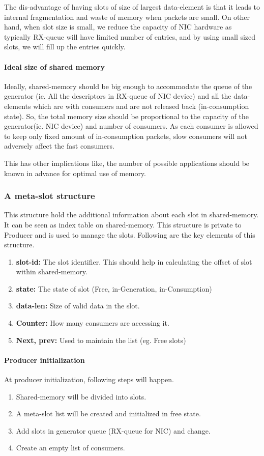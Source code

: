 \documentclass[a4paper,twoside]{report} %
\begin{document}
The dis-advantage of having slots of size of largest data-element
is that it leads to internal fragmentation and waste of memory 
when packets are small.  On other hand, when slot size is small,
we reduce the capacity of NIC hardware as typically RX-queue
will have limited number of entries, and by using small sized
slots, we will fill up the entries quickly.


\paragraph{Ideal size of shared memory}
Ideally, shared-memory should be big enough to accommodate the queue
of the generator (ie. All the descriptors in RX-queue of NIC device)
and all the data-elements which are with consumers and are not released 
back (in-consumption state).  So, the total memory size should be
proportional to the capacity of the generator(ie. NIC device) and 
number of consumers.  As each consumer is allowed to keep only fixed 
amount of in-consumption packets, slow consumers will not adversely 
affect the fast consumers.


This has other implications like, the number of possible applications
should be known in advance for optimal use of memory.

\subsubsection{A meta-slot structure}
This structure hold the additional information about each slot in
shared-memory.  It can be seen as index table on shared-memory.
This structure is private to Producer and is used to manage the
slots.  Following are the key elements of this structure.
\begin{enumerate} 
  \item \textbf{slot-id:} The slot identifier. This should help
  in calculating the offset of slot within shared-memory.
  \item \textbf{state:} The state of slot (Free, in-Generation, 
  in-Consumption)
  \item \textbf{data-len:} Size of valid data in the slot.
  \item \textbf{Counter:} How many consumers are accessing it.
  \item \textbf{Next, prev:} Used to maintain the list (eg. Free slots)
\end{enumerate} 

\paragraph{Producer initialization}
At producer initialization, following steps will happen.
\begin{enumerate} 
  \item Shared-memory will be divided into slots.
  \item A meta-slot list will be created and initialized in free state.
  \item Add slots in generator queue (RX-queue for NIC) and change.
  \item Create an empty list of consumers.
\end{enumerate} 
\end{document}
